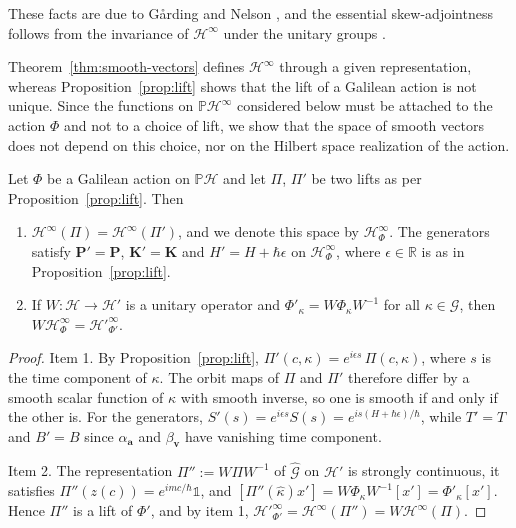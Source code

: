 \noindent These facts are due to G\aa rding and Nelson \cite[TODO-location]{TODO-Garding1947,TODO-Nelson1959}, and the essential skew-adjointness follows from the invariance of $\mathcal{H}^\infty$ under the unitary groups \cite[TODO-location]{TODO-RS03}.

Theorem~\ref{thm:smooth-vectors} defines $\mathcal{H}^\infty$ through a given representation, whereas Proposition~\ref{prop:lift} shows that the lift of a Galilean action is not unique. Since the functions on $\mathbb{P}\mathcal{H}^\infty$ considered below must be attached to the action $\Phi$ and not to a choice of lift, we show that the space of smooth vectors does not depend on this choice, nor on the Hilbert space realization of the action.

\begin{proposition}\label{prop:unique-smooth}
	Let $\Phi$ be a Galilean action on $\mathbb{P}\mathcal{H}$ and let $\Pi$, $\Pi'$ be two lifts as per Proposition~\ref{prop:lift}. Then
	\begin{enumerate}
		\item $\mathcal{H}^\infty(\Pi)=\mathcal{H}^\infty(\Pi')$, and we denote this space by $\mathcal{H}^\infty_\Phi$. The generators satisfy $\mathbf{P}'=\mathbf{P}$, $\mathbf{K}'=\mathbf{K}$ and $H'=H+\hbar\epsilon$ on $\mathcal{H}^\infty_\Phi$, where $\epsilon\in\mathbb{R}$ is as in Proposition~\ref{prop:lift}.
		\item If $W:\mathcal{H}\to\mathcal{H}'$ is a unitary operator and $\Phi'_\kappa=W\Phi_\kappa W^{-1}$ for all $\kappa\in\mathcal{G}$, then $W\mathcal{H}^\infty_\Phi=\mathcal{H}'^{\infty}_{\Phi'}$.
	\end{enumerate}
\end{proposition}

\begin{proof}
	Item 1. By Proposition~\ref{prop:lift}, $\Pi'(c,\kappa)=e^{i\epsilon s}\,\Pi(c,\kappa)$, where $s$ is the time component of $\kappa$. The orbit maps of $\Pi$ and $\Pi'$ therefore differ by a smooth scalar function of $\kappa$ with smooth inverse, so one is smooth if and only if the other is. For the generators, $S'(s)=e^{i\epsilon s}S(s)=e^{is(H+\hbar\epsilon)/\hbar}$, while $T'=T$ and $B'=B$ since $\alpha_{\mathbf{a}}$ and $\beta_{\mathbf{v}}$ have vanishing time component.
	
	Item 2. The representation $\Pi'':=W\Pi W^{-1}$ of $\widehat{\mathcal{G}}$ on $\mathcal{H}'$ is strongly continuous, it satisfies $\Pi''(z(c))=e^{imc/\hbar}\mathbb{1}$, and $[\Pi''(\hat\kappa)x']=W\Phi_\kappa W^{-1}[x']=\Phi'_\kappa[x']$. Hence $\Pi''$ is a lift of $\Phi'$, and by item 1, $\mathcal{H}'^{\infty}_{\Phi'}=\mathcal{H}^\infty(\Pi'')=W\mathcal{H}^\infty(\Pi)$.
\end{proof}

